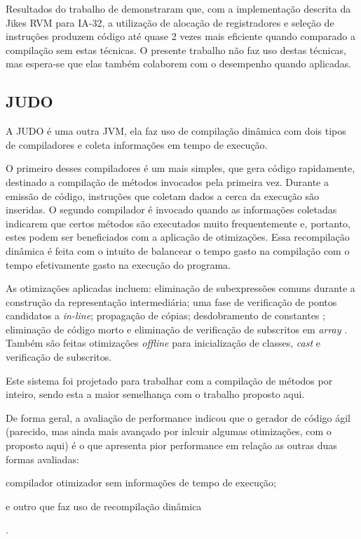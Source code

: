 Resultados do trabalho de  demonstraram que, com a
implementação descrita da Jikes RVM para IA-32, a
utilização de alocação de registradores e seleção de instruções
produzem código até quase 2 vezes mais eficiente quando comparado a
compilação sem estas técnicas. O presente trabalho não
faz uso destas técnicas, mas espera-se que elas também colaborem com
o desempenho quando aplicadas.


\subsection{JUDO}

A JUDO \cite{judo} é uma outra JVM, ela faz uso
de compilação dinâmica com dois tipos de compiladores e coleta
informações em tempo de execução.

O primeiro desses compiladores é um
mais simples, que gera código rapidamente, destinado a compilação
de métodos invocados pela primeira vez. Durante a emissão de código,
instruções que coletam dados a cerca da execução são inseridas.
O segundo compilador é
invocado quando as informações coletadas indicarem que certos métodos
são executados muito frequentemente e, portanto, estes podem ser
beneficiados com a aplicação de otimizações.
Essa recompilação dinâmica
é feita com o intuito de balancear o tempo gasto na compilação com o tempo
efetivamente gasto na execução do programa.

As otimizações aplicadas incluem: eliminação de subexpressões comuns
\cite{muchnick} durante a construção da representação intermediária;
uma fase de verificação de pontos candidatos a \textit{in-line};
propagação de cópias; desdobramento de constantes \cite{muchnick};
eliminação de código morto e eliminação de verificação de subscritos em
\textit{array} \cite{boundcheck}. Também são feitas otimizações
\textit{offline} para inicialização de classes, \textit{cast} e
verificação de subscritos.

Este sistema foi projetado para trabalhar com
a compilação de métodos por inteiro, sendo esta a maior semelhança com
o trabalho proposto aqui.

De forma geral, a avaliação de performance indicou que o gerador de
código ágil (parecido, mas ainda mais avançado por inlcuir algumas
otimizações, com o proposto aqui) é o que apresenta pior performance
em relação as outras duas formas avaliadas:
\begin{inparaenum}[(1)] \item compilador otimizador sem
informações de tempo de execução; \item e outro que faz uso de recompilação
dinâmica\end{inparaenum}.

